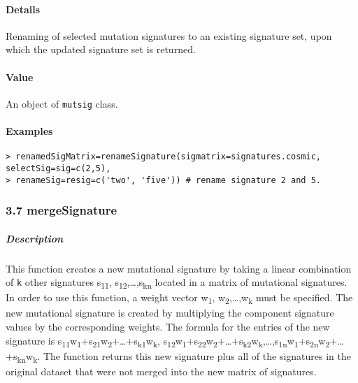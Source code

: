 \documentclass[]{article}
\let\oldparagraph\paragraph
\renewcommand{\paragraph}[1]{\oldparagraph{#1}\mbox{}}
\let\oldsubparagraph\subparagraph
\renewcommand{\subparagraph}[1]{\oldsubparagraph{#1}\mbox{}}
\begin{document}
\paragraph{\texorpdfstring{\textbf{Details}}{Details}}\label{details-4}

Renaming of selected mutation signatures to an existing signature set,
upon which the updated signature set is returned.

\paragraph{\texorpdfstring{\textbf{Value}}{Value}}\label{value-3}

An object of \texttt{mutsig} class.

\paragraph{\texorpdfstring{\textbf{Examples}}{Examples}}\label{examples-5}

\begin{verbatim}
> renamedSigMatrix=renameSignature(sigmatrix=signatures.cosmic, selectSig=sig=c(2,5), 
> renameSig=resig=c('two', 'five')) # rename signature 2 and 5.
\end{verbatim}

\subsubsection{3.7 mergeSignature}\label{mergesignature}

\subparagraph{\texorpdfstring{\textbf{Description}}{Description}}\label{description-6}

This function creates a new mutational signature by taking a linear
combination of \texttt{k} other signatures s\textsubscript{11},
s\textsubscript{12},\ldots{},s\textsubscript{kn} located in a matrix of
mutational signatures. In order to use this function, a weight vector
w\textsubscript{1}, w\textsubscript{2},\ldots{},w\textsubscript{k} must
be specified. The new mutational signature is created by multiplying the
component signature values by the corresponding weights. The formula for
the entries of the new signature is
s\textsubscript{11}w\textsubscript{1}+s\textsubscript{21}w\textsubscript{2}+\ldots{}+s\textsubscript{k1}w\textsubscript{k},
s\textsubscript{12}w\textsubscript{1}+s\textsubscript{22}w\textsubscript{2}+\ldots{}+s\textsubscript{k2}w\textsubscript{k},\ldots{},s\textsubscript{1n}w\textsubscript{1}+s\textsubscript{2n}w\textsubscript{2}+\ldots{}+s\textsubscript{kn}w\textsubscript{k}.
The function returns this new signature plus all of the signatures in
the original dataset that were not merged into the new matrix of
signatures.
\end{document}
